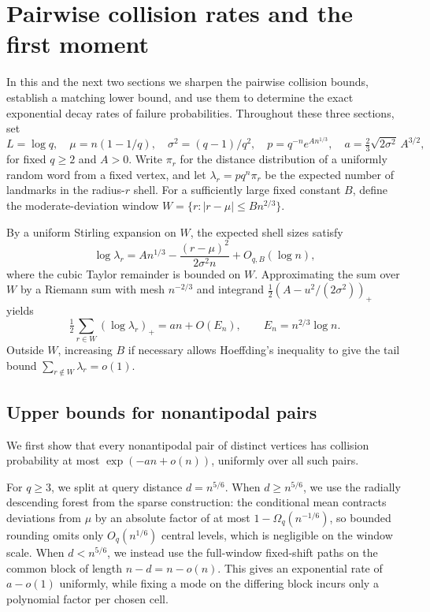 \section{Pairwise collision rates and the first moment}
In this and the next two sections we sharpen the pairwise collision bounds, establish a matching lower bound, and use them to determine the exact exponential decay rates of failure probabilities. Throughout these three sections, set
\[
 L=\log q,\quad \mu=n(1-1/q),\quad \sigma^2=(q-1)/q^2,\quad
 p=q^{-n}e^{A n^{1/3}},\quad a=\tfrac23\sqrt{2\sigma^2}\,A^{3/2},
\]
for fixed $q\ge2$ and $A>0$. Write $\pi_r$ for the distance distribution of a uniformly random word from a fixed vertex, and let $\lambda_r=pq^n\pi_r$ be the expected number of landmarks in the radius-$r$ shell. For a sufficiently large fixed constant $B$, define the moderate-deviation window $W=\{r:|r-\mu|\le Bn^{2/3}\}$.

By a uniform Stirling expansion on $W$, the expected shell sizes satisfy
\[
 \log\lambda_r=A n^{1/3}-\frac{(r-\mu)^2}{2\sigma^2n}+O_{q,B}(\log n),
\]
where the cubic Taylor remainder is bounded on $W$. Approximating the sum over $W$ by a Riemann sum with mesh $n^{-2/3}$ and integrand $\tfrac12(A-u^2/(2\sigma^2))_+$ yields
\[
 \tfrac12\sum_{r\in W}(\log\lambda_r)_+=an+O(E_n),
 \qquad E_n=n^{2/3}\log n.
\]
Outside $W$, increasing $B$ if necessary allows Hoeffding's inequality to give the tail bound $\sum_{r\notin W}\lambda_r=o(1)$.

\subsection{Upper bounds for nonantipodal pairs}
We first show that every nonantipodal pair of distinct vertices has collision probability at most $\exp(-an+o(n))$, uniformly over all such pairs.

For $q\ge3$, we split at query distance $d=n^{5/6}$. When $d\ge n^{5/6}$, we use the radially descending forest from the sparse construction: the conditional mean contracts deviations from $\mu$ by an absolute factor of at most $1-\Omega_q(n^{-1/6})$, so bounded rounding omits only $O_q(n^{1/6})$ central levels, which is negligible on the window scale. When $d<n^{5/6}$, we instead use the full-window fixed-shift paths on the common block of length $n-d=n-o(n)$. This gives an exponential rate of $a-o(1)$ uniformly, while fixing a mode on the differing block incurs only a polynomial factor per chosen cell.

